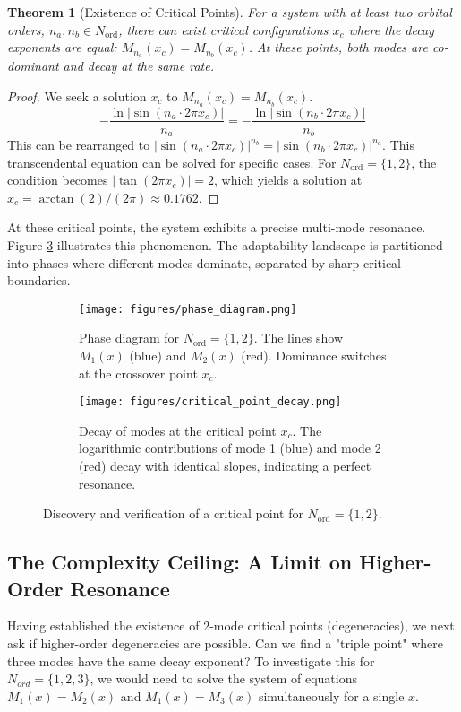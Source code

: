 \documentclass[11pt,a4paper]{article}
\newtheorem{theorem}{Theorem}[section]
\begin{document}
\begin{theorem}[Existence of Critical Points]
For a system with at least two orbital orders, $n_a, n_b \in N_{\text{ord}}$, there can exist critical configurations $x_c$ where the decay exponents are equal: $M_{n_a}(x_c) = M_{n_b}(x_c)$. At these points, both modes are co-dominant and decay at the same rate.
\end{theorem}

\begin{proof}
We seek a solution $x_c$ to $M_{n_a}(x_c) = M_{n_b}(x_c)$.
$$ -\frac{\ln|\sin(n_a \cdot 2\pi x_c)|}{n_a} = -\frac{\ln|\sin(n_b \cdot 2\pi x_c)|}{n_b} $$
This can be rearranged to $|\sin(n_a \cdot 2\pi x_c)|^{n_b} = |\sin(n_b \cdot 2\pi x_c)|^{n_a}$. This transcendental equation can be solved for specific cases. For $N_{\text{ord}}=\{1,2\}$, the condition becomes $|\tan(2\pi x_c)|=2$, which yields a solution at $x_c = \arctan(2)/(2\pi) \approx 0.1762$.
\end{proof}

At these critical points, the system exhibits a precise multi-mode resonance. Figure \ref{fig:critical_point} illustrates this phenomenon. The adaptability landscape is partitioned into phases where different modes dominate, separated by sharp critical boundaries.

\begin{figure}[H]
    \centering
    \begin{subfigure}[b]{0.48\textwidth}
        \centering
        \texttt{[image: figures/phase\_diagram.png]}
        \caption{Phase diagram for $N_{\text{ord}}=\{1,2\}$. The lines show $M_1(x)$ (blue) and $M_2(x)$ (red). Dominance switches at the crossover point $x_c$.}
        \label{fig:phase_diagram}
    \end{subfigure}
    \hfill
    \begin{subfigure}[b]{0.48\textwidth}
        \centering
        \texttt{[image: figures/critical\_point\_decay.png]}
        \caption{Decay of modes at the critical point $x_c$. The logarithmic contributions of mode 1 (blue) and mode 2 (red) decay with identical slopes, indicating a perfect resonance.}
        \label{fig:critical_decay}
    \end{subfigure}
    \caption{Discovery and verification of a critical point for $N_{\text{ord}}=\{1,2\}$.}
    \label{fig:critical_point}
\end{figure}

\subsection{The Complexity Ceiling: A Limit on Higher-Order Resonance}
Having established the existence of 2-mode critical points (degeneracies), we next ask if higher-order degeneracies are possible. Can we find a "triple point" where three modes have the same decay exponent? To investigate this for $N_{ord}=\{1,2,3\}$, we would need to solve the system of equations $M_1(x)=M_2(x)$ and $M_1(x)=M_3(x)$ simultaneously for a single $x$.
\end{document}
